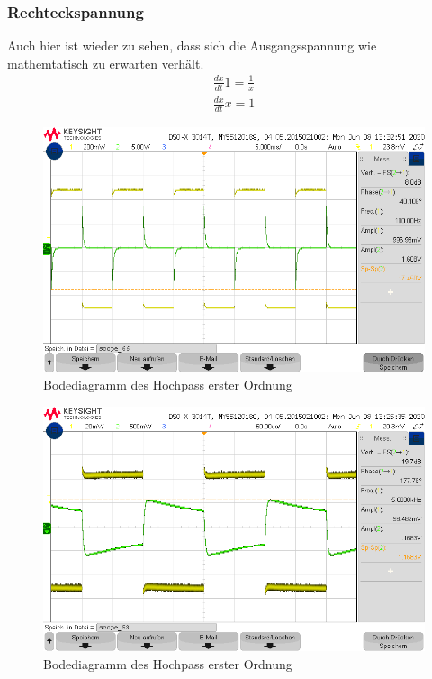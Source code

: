 \subsubsection{Rechteckspannung}
Auch hier ist wieder zu sehen, dass sich die Ausgangsspannung wie mathemtatisch zu erwarten verhält.
\begin{align}
    \frac{dx}{dt}1=\frac{1}{x}\\
    \frac{dx}{dt}x = 1
\end{align}
\begin{figure}[H]
    \centering
    \includegraphics[width=\costumPicWidth]{Lab_2/Messungen/HP_first_order/scope_66.png}
    \caption{Bodediagramm des Hochpass erster Ordnung}
    \label{fig:Bode_HP_first_order}
\end{figure}
\begin{figure}[H]
    \centering
    \includegraphics[width=\costumPicWidth]{Lab_2/Messungen/HP_first_order/scope_53.png}
    \caption{Bodediagramm des Hochpass erster Ordnung}
    \label{fig:Bode_HP_first_order}
\end{figure}

